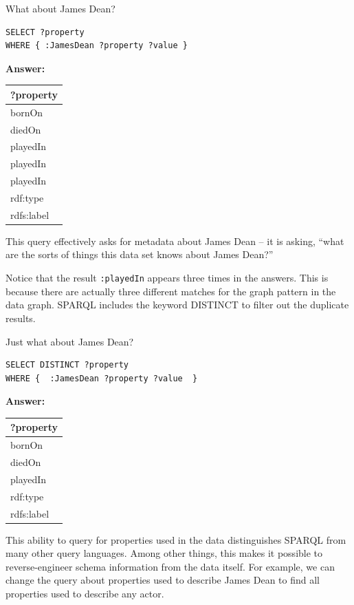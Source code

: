 \begin{query}What about James Dean?\end{query}
\begin{lstlisting}
SELECT ?property
WHERE { :JamesDean ?property ?value }
\end{lstlisting}

\textbf{\textbf{Answer:}}

\begin{tabular}{|l|}
\hline
?property\\
\hline
bornOn\\
diedOn\\
playedIn\\
playedIn\\
playedIn\\
rdf:type\\
rdfs:label\\
\hline
\end{tabular}

This query effectively asks for metadata about James Dean -- it is
asking, ``what are the sorts of things this data set knows about James
Dean?''

Notice that the result \texttt{:playedIn} appears three times in the answers.
This is because there are actually three different matches for the graph
pattern in the data graph. SPARQL includes the keyword DISTINCT to
filter out the duplicate results.

\begin{query}Just what about James Dean?\end{query}

\begin{lstlisting}
SELECT DISTINCT ?property
WHERE {  :JamesDean ?property ?value  }
\end{lstlisting}

\textbf{\textbf{Answer:} }

\begin{tabular}{|l|}
\hline
?property\\
\hline
bornOn\\
diedOn\\
playedIn\\
rdf:type\\
rdfs:label\\
\hline
\end{tabular}

This ability to query for properties used in the data distinguishes
SPARQL from many other query languages. Among other things, this makes
it possible to reverse-engineer schema information from the data itself.
For example, we can change the query about properties used to describe
James Dean to find all properties used to describe any actor.

